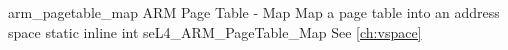 %
%
%
%

\apidoc
{arm_pagetable_map}
{ARM Page Table - Map}
{Map a page table into an address space}
{static inline int seL4\_ARM\_PageTable\_Map}
{
}
{\errorenumdesc}
{See \autoref{ch:vspace}}

